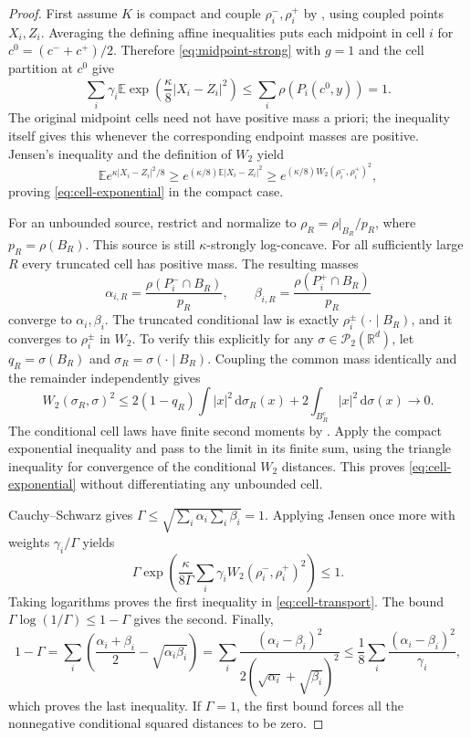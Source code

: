 \documentclass[11pt]{article}
\numberwithin{equation}{section}
\theoremstyle{remark}
\newcommand{\R}{\mathbb R}
\newcommand{\E}{\mathbb E}
\newcommand{\Prob}{\mathcal P}
\newcommand{\dd}{\,\mathrm d}
\begin{document}
\begin{proof}
First assume $K$ is compact and couple $\rho_i^-,\rho_i^+$ by , using coupled points $X_i,Z_i$. Averaging the defining affine inequalities puts each midpoint in cell $i$ for $c^0=(c^-+c^+)/2$. Therefore \eqref{eq:midpoint-strong} with $g=1$ and the cell partition at $c^0$ give
\[
 \sum_i\gamma_i\E\exp\left(\frac\kappa8|X_i-Z_i|^2\right)
 \le\sum_i\rho(P_i(c^0,y))=1.
\]
The original midpoint cells need not have positive mass a priori; the inequality itself gives this whenever the corresponding endpoint masses are positive. Jensen's inequality and the definition of $W_2$ yield
\[
 \E e^{\kappa|X_i-Z_i|^2/8}
 \ge e^{(\kappa/8)\E|X_i-Z_i|^2}
 \ge e^{(\kappa/8)W_2(\rho_i^-,\rho_i^+)^2},
\]
proving \eqref{eq:cell-exponential} in the compact case.

For an unbounded source, restrict and normalize to $\rho_R=\rho|_{B_R}/p_R$, where $p_R=\rho(B_R)$. This source is still $\kappa$-strongly log-concave. For all sufficiently large $R$ every truncated cell has positive mass. The resulting masses
\[
 \alpha_{i,R}=\frac{\rho(P_i^-\cap B_R)}{p_R},\qquad
 \beta_{i,R}=\frac{\rho(P_i^+\cap B_R)}{p_R}
\]
converge to $\alpha_i,\beta_i$. The truncated conditional law is exactly $\rho_i^\pm(\cdot\mid B_R)$, and it converges to $\rho_i^\pm$ in $W_2$. To verify this explicitly for any $\sigma\in\Prob_2(\R^d)$, let $q_R=\sigma(B_R)$ and $\sigma_R=\sigma(\cdot\mid B_R)$. Coupling the common mass identically and the remainder independently gives
\[
 W_2(\sigma_R,\sigma)^2
 \le2(1-q_R)\int|x|^2\dd\sigma_R(x)
      +2\int_{B_R^c}|x|^2\dd\sigma(x)\longrightarrow0.
\]
The conditional cell laws have finite second moments by . Apply the compact exponential inequality and pass to the limit in its finite sum, using the triangle inequality for convergence of the conditional $W_2$ distances. This proves \eqref{eq:cell-exponential} without differentiating any unbounded cell.

Cauchy--Schwarz gives $\Gamma\le\sqrt{\sum_i\alpha_i\sum_i\beta_i}=1$. Applying Jensen once more with weights $\gamma_i/\Gamma$ yields
\[
 \Gamma\exp\left(\frac{\kappa}{8\Gamma}
        \sum_i\gamma_iW_2(\rho_i^-,\rho_i^+)^2\right)\le1.
\]
Taking logarithms proves the first inequality in \eqref{eq:cell-transport}. The bound $\Gamma\log(1/\Gamma)\le1-\Gamma$ gives the second. Finally,
\[
 1-\Gamma
 =\sum_i\left(\frac{\alpha_i+\beta_i}{2}-\sqrt{\alpha_i\beta_i}\right)
 =\sum_i\frac{(\alpha_i-\beta_i)^2}
                 {2(\sqrt{\alpha_i}+\sqrt{\beta_i})^2}
 \le\frac18\sum_i\frac{(\alpha_i-\beta_i)^2}{\gamma_i},
\]
which proves the last inequality. If $\Gamma=1$, the first bound forces all the nonnegative conditional squared distances to be zero.
\end{proof}
\end{document}
